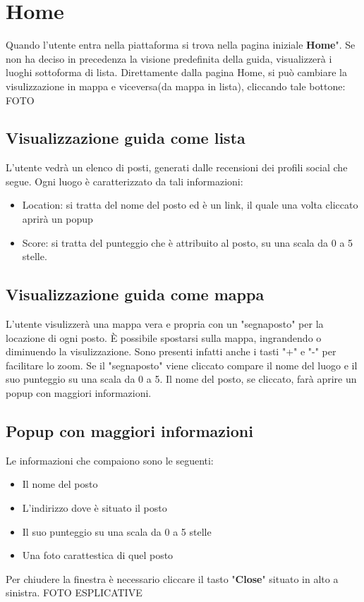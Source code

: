 \section{Home} {
    Quando l'utente entra nella piattaforma si trova nella pagina iniziale \textbf{Home}". \aCapo
    Se non ha deciso in precedenza la visione predefinita della guida, visualizzerà i luoghi sottoforma di lista. 
    Direttamente dalla pagina Home, si può cambiare la visulizzazione in mappa e viceversa(da mappa in lista), cliccando tale bottone:
    FOTO

    \subsection{Visualizzazione guida come lista} {
        L'utente vedrà un elenco di posti, generati dalle recensioni dei profili social che segue. \aCapo
        Ogni luogo è caratterizzato da tali informazioni: 
        \begin{itemize}
            \item Location: si tratta del nome del posto ed è un link, il quale una volta cliccato aprirà un popup 
            \item Score: si tratta del punteggio che è attribuito al posto, su una scala da 0 a 5 stelle.
        \end{itemize}       
    }

    \subsection{Visualizzazione guida come mappa} {
        L'utente visulizzerà una mappa vera e propria con un "segnaposto" per la locazione di ogni posto. È possibile spostarsi sulla mappa, ingrandendo o diminuendo la visulizzazione. 
        Sono presenti infatti anche i tasti "+" e "-" per facilitare lo zoom. \aCapo
        Se il "segnaposto" viene cliccato compare il nome del luogo e il suo punteggio su una scala da 0 a 5. Il nome del posto, se cliccato, farà aprire un popup con maggiori informazioni.

    }

    \subsection{Popup con maggiori informazioni} {
        Le informazioni che compaiono sono le seguenti:
        \begin{itemize}
            \item Il nome del posto
            \item L'indirizzo dove è situato il posto
            \item Il suo punteggio su una scala da 0 a 5 stelle
            \item Una foto carattestica di quel posto
        \end{itemize}

        Per chiudere la finestra è necessario cliccare il tasto "\textbf{Close}" situato in alto a sinistra.
        FOTO ESPLICATIVE
    }
}
